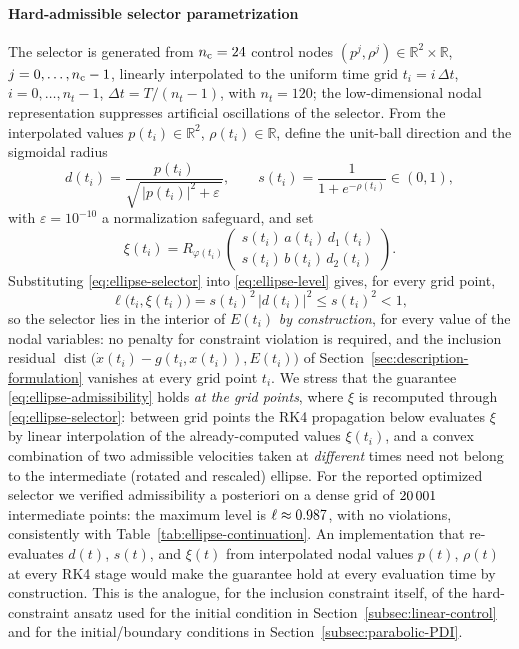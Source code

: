 \documentclass[11pt]{elsarticle}
\theoremstyle{definition}
\theoremstyle{remark}
\numberwithin{equation}{section}
\def\dist{\operatorname{dist}}
\begin{document}
\paragraph{Hard-admissible selector parametrization}
The selector is generated from $n_{\rm c}=24$ control nodes
$(p^j,\rho^j)\in\mathbb{R}^2\times\mathbb{R}$, $j=0,\dots,n_{\rm c}-1$,
linearly interpolated to the uniform time grid
$t_i=i\,\Delta t$, $i=0,\dots,n_t-1$, $\Delta t=T/(n_t-1)$, with
$n_t=120$; the low-dimensional nodal representation suppresses
artificial oscillations of the selector. From the interpolated values
$p(t_i)\in\mathbb{R}^2$, $\rho(t_i)\in\mathbb{R}$, define the unit-ball
direction and the sigmoidal radius
\begin{equation}
	\label{eq:ellipse-dir-radius}
	d(t_i)=\frac{p(t_i)}{\sqrt{\,|p(t_i)|^2+\varepsilon\,}},
	\qquad
	s(t_i)=\frac{1}{1+e^{-\rho(t_i)}}\in(0,1),
\end{equation}
with $\varepsilon=10^{-10}$ a normalization safeguard, and set
\begin{equation}
	\label{eq:ellipse-selector}
	\xi(t_i)
	=R_{\varphi(t_i)}
	\begin{pmatrix}
		s(t_i)\,a(t_i)\,d_1(t_i)\\
		s(t_i)\,b(t_i)\,d_2(t_i)
	\end{pmatrix}.
\end{equation}
Substituting \eqref{eq:ellipse-selector} into
\eqref{eq:ellipse-level} gives, for every grid point,
\begin{equation}
	\label{eq:ellipse-admissibility}
	\ell\bigl(t_i,\xi(t_i)\bigr)
	=s(t_i)^2\,|d(t_i)|^2
	\le s(t_i)^2<1,
\end{equation}
so the selector lies in the interior of $E(t_i)$ \emph{by construction},
for every value of the nodal variables: no penalty for constraint
violation is required, and the inclusion residual
$\dist\bigl(\dot x(t_i)-g(t_i,x(t_i)),E(t_i)\bigr)$ of
Section~\ref{sec:description-formulation} vanishes at every grid point
$t_i$. We stress that the guarantee \eqref{eq:ellipse-admissibility}
holds \emph{at the grid points}, where $\xi$ is recomputed through
\eqref{eq:ellipse-selector}: between grid points the RK4 propagation
below evaluates $\xi$ by linear interpolation of the already-computed
values $\xi(t_i)$, and a convex combination of two admissible velocities
taken at \emph{different} times need not belong to the intermediate
(rotated and rescaled) ellipse. For the reported optimized selector we
verified admissibility a posteriori on a dense grid of $20\,001$
intermediate points: the maximum level is $\ell\approx0.987$,
with no violations, consistently with Table~\ref{tab:ellipse-continuation}.
An implementation that re-evaluates $d(t)$, $s(t)$, and $\xi(t)$ from
interpolated nodal values $p(t)$, $\rho(t)$ at every RK4 stage would make
the guarantee hold at every evaluation time by construction. This is
the analogue, for the inclusion constraint itself, of the hard-constraint
ansatz used for the initial condition in
Section~\ref{subsec:linear-control} and for the initial/boundary
conditions in Section~\ref{subsec:parabolic-PDI}.
\end{document}
